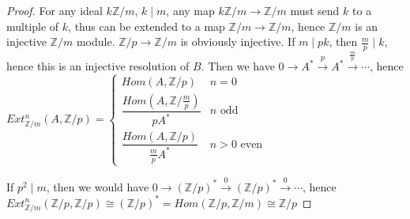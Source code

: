 \documentclass{article}
\theoremstyle{definition}
\theoremstyle{remark}
\theoremstyle{definition}
\begin{document}
\begin{proof}
For any ideal $k\mathbb Z/m$, $k\mid m$, any map $k\mathbb Z/m\to\mathbb Z/m$ must send $k$ to a multiple of $k$, thus can be extended to a map $\mathbb Z/m\to\mathbb Z/m$, hence $\mathbb Z/m$ is an injective $\mathbb Z/m$ module. $\mathbb Z/p\to\mathbb Z/m$ is obviously injective. If $m\mid pk$, then $\frac{m}{p}\mid k$, hence this is an injective resolution of $B$. Then we have $0\to A^*\xrightarrow{p} A^*\xrightarrow{\frac{m}{p}}\cdots$, hence $Ext^n_{\mathbb Z/m}(A,\mathbb Z/p)=\begin{cases}
Hom(A,\mathbb Z/p) &n=0 \\
\dfrac{Hom(A,\mathbb Z/\frac{m}{p})}{pA^*} &n\text{ odd} \\
\dfrac{Hom(A,\mathbb Z/p)}{\frac{m}{p}A^*} &n>0\text{ even}
\end{cases}$ \par
If $p^2\mid m$, then we would have $0\to (\mathbb Z/p)^*\xrightarrow{0}(\mathbb Z/p)^*\xrightarrow{0}\cdots$, hence $Ext^n_{\mathbb Z/m}(\mathbb Z/p,\mathbb Z/p)\cong(\mathbb Z/p)^*=Hom(\mathbb Z/p,\mathbb Z/m)\cong\mathbb Z/p$
\end{proof}
\end{document}
